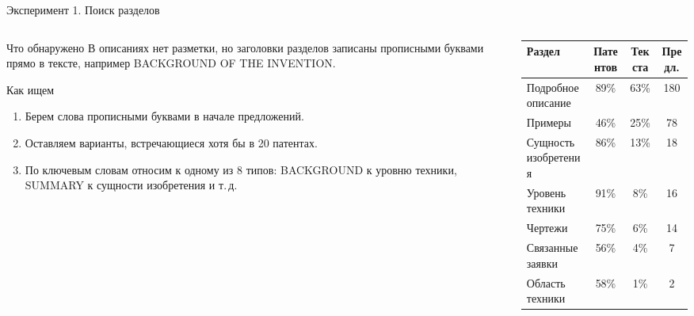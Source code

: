 \documentclass[aspectratio=169]{beamer}
\begin{document}
\begin{frame}{Эксперимент 1. Поиск разделов}
    \footnotesize
    \begin{columns}[T]
        \begin{column}{0.48\textwidth}
            \begin{block}{Что обнаружено}
                В описаниях нет разметки, но заголовки разделов записаны прописными буквами прямо в тексте, например BACKGROUND OF THE INVENTION.
            \end{block}
            \begin{block}{Как ищем}
                \begin{enumerate}[1)]
                    \item Берем слова прописными буквами в начале предложений.
                    \item Оставляем варианты, встречающиеся хотя бы в 20 патентах.
                    \item По ключевым словам относим к одному из 8 типов: BACKGROUND к уровню техники, SUMMARY к сущности изобретения и т.\,д.
                \end{enumerate}
            \end{block}
        \end{column}
        \begin{column}{0.48\textwidth}
            \centering
            \setlength{\tabcolsep}{3pt}
            \begin{tabular}{lccc}
                \toprule
                \textbf{Раздел} & \textbf{Патентов} & \textbf{Текста} & \textbf{Предл.} \\
                \midrule
                Подробное описание & 89\% & 63\% & 180 \\
                Примеры & 46\% & 25\% & 78 \\
                Сущность изобретения & 86\% & 13\% & 18 \\
                Уровень техники & 91\% & 8\% & 16 \\
                Чертежи & 75\% & 6\% & 14 \\
                Связанные заявки & 56\% & 4\% & 7 \\
                Область техники & 58\% & 1\% & 2 \\
                \bottomrule
            \end{tabular}


\end{column}
\end{columns}
\end{frame}
\end{document}
